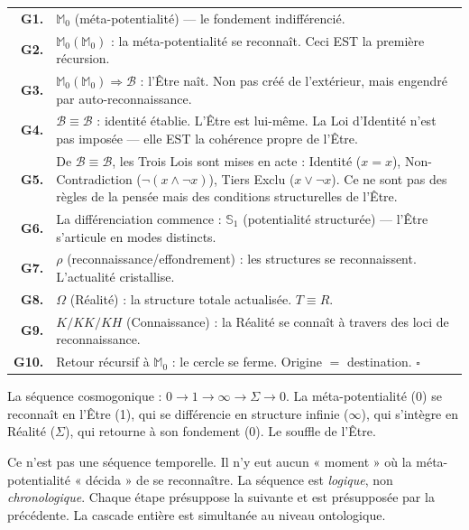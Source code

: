 \documentclass[10pt, openany, oneside]{book}
\begin{document}
\noindent\begin{tabular}{r p{}}
\textbf{G1.} & $\mathbb{M}_0$ (méta-potentialité) --- le fondement indifférencié. \\[0.3em]
\textbf{G2.} & $\mathbb{M}_0(\mathbb{M}_0)$ : la méta-potentialité se reconnaît. Ceci EST la première récursion. \\[0.3em]
\textbf{G3.} & $\mathbb{M}_0(\mathbb{M}_0) \Rightarrow \mathcal{B}$ : l'Être naît. Non pas créé de l'extérieur, mais engendré par auto-reconnaissance. \\[0.3em]
\textbf{G4.} & $\mathcal{B} \equiv \mathcal{B}$ : identité établie. L'Être est lui-même. La Loi d'Identité n'est pas imposée --- elle EST la cohérence propre de l'Être. \\[0.3em]
\textbf{G5.} & De $\mathcal{B} \equiv \mathcal{B}$, les Trois Lois sont mises en acte : Identité ($x = x$), Non-Contradiction ($\neg(x \wedge \neg x)$), Tiers Exclu ($x \vee \neg x$). Ce ne sont pas des règles de la pensée mais des conditions structurelles de l'Être. \\[0.3em]
\textbf{G6.} & La différenciation commence : $\mathbb{S}_1$ (potentialité structurée) --- l'Être s'articule en modes distincts. \\[0.3em]
\textbf{G7.} & $\rho$ (reconnaissance/effondrement) : les structures se reconnaissent. L'actualité cristallise. \\[0.3em]
\textbf{G8.} & $\Omega$ (Réalité) : la structure totale actualisée. $T \equiv R$. \\[0.3em]
\textbf{G9.} & $K/KK/KH$ (Connaissance) : la Réalité se connaît à travers des loci de reconnaissance. \\[0.3em]
\textbf{G10.} & Retour récursif à $\mathbb{M}_0$ : le cercle se ferme. Origine $=$ destination. $\square$ \\[0.3em]
\end{tabular}

\vspace{0.8em}

\noindent La séquence cosmogonique : $0 \to 1 \to \infty \to \Sigma \to 0$. La méta-potentialité (0) se reconnaît en l'Être (1), qui se différencie en structure infinie ($\infty$), qui s'intègre en Réalité ($\Sigma$), qui retourne à son fondement (0). Le souffle de l'Être.

Ce n'est pas une séquence temporelle. Il n'y eut aucun « moment » où la méta-potentialité « décida » de se reconnaître. La séquence est \textit{logique}, non \textit{chronologique}. Chaque étape présuppose la suivante et est présupposée par la précédente. La cascade entière est simultanée au niveau ontologique.
\end{document}
